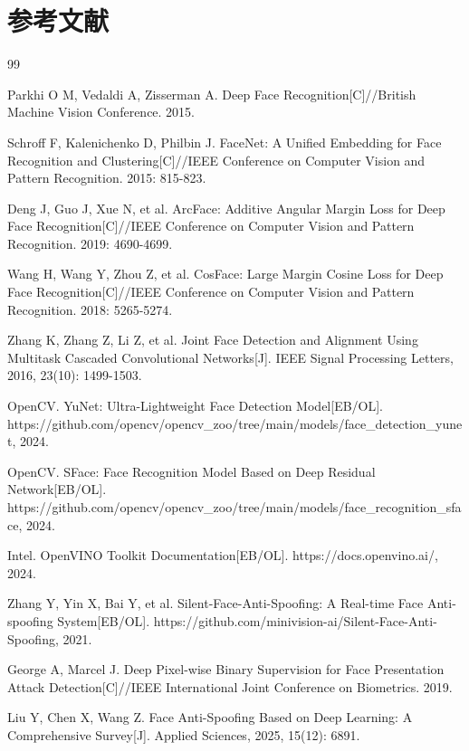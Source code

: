 \documentclass{heuthesis}
\begin{document}
\clearpage
\section*{\centering{}参考文献}

\begin{thebibliography}{99}

Parkhi O M, Vedaldi A, Zisserman A. Deep Face Recognition[C]//British Machine Vision Conference. 2015.

Schroff F, Kalenichenko D, Philbin J. FaceNet: A Unified Embedding for Face Recognition and Clustering[C]//IEEE Conference on Computer Vision and Pattern Recognition. 2015: 815-823.

Deng J, Guo J, Xue N, et al. ArcFace: Additive Angular Margin Loss for Deep Face Recognition[C]//IEEE Conference on Computer Vision and Pattern Recognition. 2019: 4690-4699.

Wang H, Wang Y, Zhou Z, et al. CosFace: Large Margin Cosine Loss for Deep Face Recognition[C]//IEEE Conference on Computer Vision and Pattern Recognition. 2018: 5265-5274.

Zhang K, Zhang Z, Li Z, et al. Joint Face Detection and Alignment Using Multitask Cascaded Convolutional Networks[J]. IEEE Signal Processing Letters, 2016, 23(10): 1499-1503.

OpenCV. YuNet: Ultra-Lightweight Face Detection Model[EB/OL]. https://github.com/opencv/opencv\_zoo/tree/main/models/face\_detection\_yunet, 2024.

OpenCV. SFace: Face Recognition Model Based on Deep Residual Network[EB/OL]. https://github.com/opencv/opencv\_zoo/tree/main/models/face\_recognition\_sface, 2024.

Intel. OpenVINO Toolkit Documentation[EB/OL]. https://docs.openvino.ai/, 2024.

Zhang Y, Yin X, Bai Y, et al. Silent-Face-Anti-Spoofing: A Real-time Face Anti-spoofing System[EB/OL]. https://github.com/minivision-ai/Silent-Face-Anti-Spoofing, 2021.

George A, Marcel J. Deep Pixel-wise Binary Supervision for Face Presentation Attack Detection[C]//IEEE International Joint Conference on Biometrics. 2019.

Liu Y, Chen X, Wang Z. Face Anti-Spoofing Based on Deep Learning: A Comprehensive Survey[J]. Applied Sciences, 2025, 15(12): 6891.


\end{thebibliography}
\end{document}
